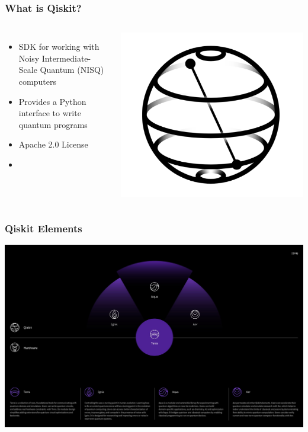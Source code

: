 \documentclass[aspectratio=169,11pt,hyperref={colorlinks=true}]{beamer}
\begin{document}
\begin{frame}
    \frametitle{What is Qiskit?}
    \begin{columns}
            \begin{itemize}
                \item SDK for working with Noisy Intermediate-Scale Quantum (NISQ) computers
                \item Provides a Python interface to write quantum programs
                \item Apache 2.0 License
                \item 
            \end{itemize}
            \includegraphics[width=\textwidth]{qiskit_logo.png}
    \end{columns}
\end{frame}

\begin{frame}
    \frametitle{Qiskit Elements}
    \centering
    \includegraphics[width=.9\textwidth]{qiskit-components.jpeg}
\end{frame}
\end{document}
